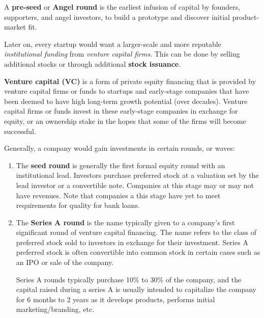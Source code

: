 \documentclass{article}
\begin{document}
    \begin{definition}
      \label{def:pre-seed-seed-funding}
      A \textbf{pre-seed} or \textbf{Angel round} is the earliest infusion of capital by founders, supporters, and angel investors, to build a prototype and discover initial product-market fit. 
    \end{definition}

    Later on, every startup would want a larger-scale and more reputable \textit{institutional funding} from \textit{venture capital firms}. This can be done by selling additional stocks or through additional \textbf{stock issuance}. 

    \begin{definition}
      \label{def:venture-capital-vc-rounds}
      \textbf{Venture capital (VC)} is a form of private equity financing that is provided by venture capital firms or funds to startups and early-stage companies that have been deemed to have high long-term growth potential (over decades). Venture capital firms or funds invest in these early-stage companies in exchange for equity, or an ownership stake in the hopes that some of the firms will become successful. 

      Generally, a company would gain investments in certain rounds, or waves:
      \begin{enumerate}
        \item The \textbf{seed round} is generally the first formal equity round with an institutional lead. Investors purchase preferred stock at a valuation set by the lead investor or a convertible note. Companies at this stage may or may not have revenues. Note that companies a this stage have yet to meet requirements for quality for bank loans. 
        \item The \textbf{Series A round} is the name typically given to a company's first significant round of venture capital financing. The name refers to the class of preferred stock sold to investors in exchange for their investment. Series A preferred stock is often convertible into common stock in certain cases such as an IPO or sale of the company. 
        
        Series A rounds typically purchase 10\% to 30\% of the company, and the capital raised during a series A is usually intended to capitalize the company for 6 months to 2 years as it develops products, performs initial marketing/branding, etc. 
        

\end{enumerate}
\end{definition}
\end{document}
